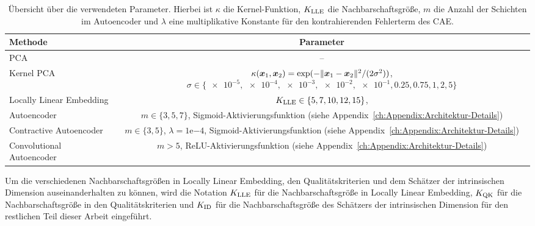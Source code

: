 \begin{table}[htb]
	\tymax=300pt
	\centering
	\begin{tabulary}{\linewidth}{LC}
		\toprule
		Methode                            & Parameter                                                            \\ \midrule
		PCA      & --                                                                   \\
		Kernel PCA                         & $\kappa(\bm{x}_1, \bm{x}_2) = \exp(- \lVert\bm{x}_1 - \bm{x}_2\rVert^2/(2\sigma^2))$, $\sigma \in \{\num{e-5},\num{e-4}, \num{e-3}, \num{e-2}, \num{e-1}, 0.25, 0.75, 1, 2, 5\}$ \\
		Locally Linear Embedding     & $K_{\text{LLE}} \in \{ 5, 7, 10, 12, 15\}$,                      \\
		Autoencoder                  & $m \in \{3, 5, 7\}$, Sigmoid-Aktivierungsfunktion \newline (siehe
		Appendix~\ref{ch:Appendix:Architektur-Details})                                                           \\  Contractive Autoencoder & $m \in \{3, 5\}$, $\lambda=1\mathrm{e}{-4}$,
		Sigmoid-Aktivierungsfunktion (siehe Appendix~\ref{ch:Appendix:Architektur-Details})                       \\
		Convolutional Autoencoder & $m > 5$, ReLU-Aktivierungsfunktion \newline (siehe
		Appendix~\ref{ch:Appendix:Architektur-Details})                                                           \\ \bottomrule
	\end{tabulary}
	\caption[Übersicht über die verwendeten Parameter der Methoden]{Übersicht über die verwendeten Parameter. Hierbei ist $\kappa$ die Kernel-Funktion, $K_{\text{LLE}}$ die Nachbarschaftsgröße, $m$ die Anzahl der Schichten im Autoencoder und $\lambda$ eine multiplikative Konstante für den kontrahierenden Fehlerterm des CAE.}
	\label{tab:uebersicht-parameter}
\end{table}

Um die verschiedenen Nachbarschaftsgrößen in Locally Linear Embedding, den Qualitätskriterien und
dem Schätzer der intrinsischen Dimension auseinanderhalten zu können, wird die Notation $K_{\text{LLE}}$ für
die Nachbarschaftsgröße in Locally Linear Embedding, $K_{\text{QK}}$ für die Nachbarschaftsgröße in den
Qualitätskriterien und $K_{\text{ID}}$ für die Nachbarschaftsgröße des Schätzers der intrinsischen Dimension
für den restlichen Teil dieser Arbeit eingeführt.

